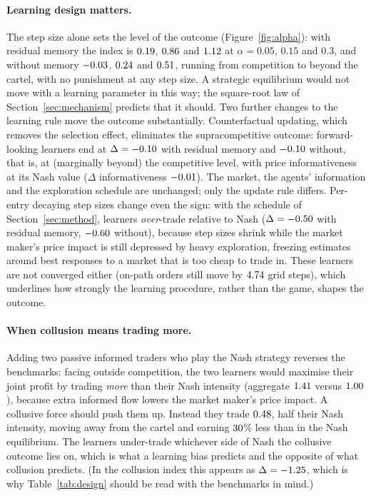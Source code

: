 \paragraph{Learning design matters.} The step size alone sets the level of the
outcome (Figure~\ref{fig:alpha}): with residual memory the index is
$0.19$, $0.86$ and $1.12$ at $\alpha=0.05$,
$0.15$ and $0.3$, and without memory $-0.03$, $0.24$ and
$0.51$, running from competition to beyond the cartel, with no
punishment at any step size. A strategic equilibrium would not move with a
learning parameter in this way; the square-root law of
Section~\ref{sec:mechanism} predicts that it should. Two further changes to
the learning rule move the outcome substantially. Counterfactual updating, which removes the selection
effect, eliminates the supracompetitive outcome: forward-looking learners end
at $\Delta=-0.10$ with residual memory and $-0.10$ without,
that is, at (marginally beyond) the competitive level, with price
informativeness at its Nash value ($\Delta$ informativeness
$-0.01$). The market, the agents' information and the exploration
schedule are unchanged; only the update rule differs. Per-entry decaying step sizes
change even the sign: with the schedule of Section~\ref{sec:method}, learners
\emph{over}-trade relative to Nash ($\Delta=-0.50$ with residual
memory, $-0.60$ without), because step sizes shrink while the market
maker's price impact is still depressed by heavy exploration, freezing
estimates around best responses to a market that is too cheap to trade in.
These learners are not converged either (on-path orders still move by
$4.74$ grid steps), which underlines how strongly the learning
procedure, rather than the game, shapes the outcome.

\paragraph{When collusion means trading more.} Adding two passive informed
traders who play the Nash strategy reverses the benchmarks: facing outside
competition, the two learners would maximise their joint profit by trading
\emph{more} than their Nash intensity (aggregate $1.41$ versus
$1.00$), because extra informed flow lowers the market maker's price
impact. A collusive force should push them up. Instead they trade
$0.48$, half their Nash intensity, moving away from the cartel and
earning $30$\% less than in the Nash equilibrium. The learners
under-trade whichever side of Nash the collusive outcome lies on, which is what a
learning bias predicts and the opposite of what collusion predicts. (In the
collusion index this appears as $\Delta=-1.25$, which is why
Table~\ref{tab:design} should be read with the benchmarks in mind.)

